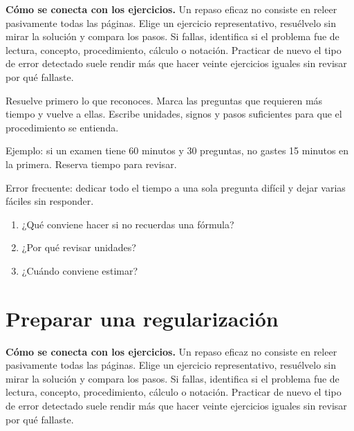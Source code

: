 \documentclass[10pt,oneside,openany]{book}
\begin{document}
\textbf{Cómo se conecta con los ejercicios.} Un repaso eficaz no consiste en releer pasivamente todas las páginas. Elige un ejercicio representativo, resuélvelo sin mirar la solución y compara los pasos. Si fallas, identifica si el problema fue de lectura, concepto, procedimiento, cálculo o notación. Practicar de nuevo el tipo de error detectado suele rendir más que hacer veinte ejercicios iguales sin revisar por qué fallaste.

Resuelve primero lo que reconoces. Marca las preguntas que requieren más tiempo y vuelve a ellas. Escribe unidades, signos y pasos suficientes para que el procedimiento se entienda.

\begin{ejemplo}
Ejemplo: si un examen tiene 60 minutos y 30 preguntas, no gastes 15 minutos en la primera. Reserva tiempo para revisar.
\end{ejemplo}

\begin{ojo}
Error frecuente: dedicar todo el tiempo a una sola pregunta difícil y dejar varias fáciles sin responder.
\end{ojo}

\begin{practica}

\begin{enumerate}

\item ¿Qué conviene hacer si no recuerdas una fórmula?

\item ¿Por qué revisar unidades?

\item ¿Cuándo conviene estimar?

\end{enumerate}

\end{practica}



\section{Preparar una regularización}

\textbf{Cómo se conecta con los ejercicios.} Un repaso eficaz no consiste en releer pasivamente todas las páginas. Elige un ejercicio representativo, resuélvelo sin mirar la solución y compara los pasos. Si fallas, identifica si el problema fue de lectura, concepto, procedimiento, cálculo o notación. Practicar de nuevo el tipo de error detectado suele rendir más que hacer veinte ejercicios iguales sin revisar por qué fallaste.
\end{document}
